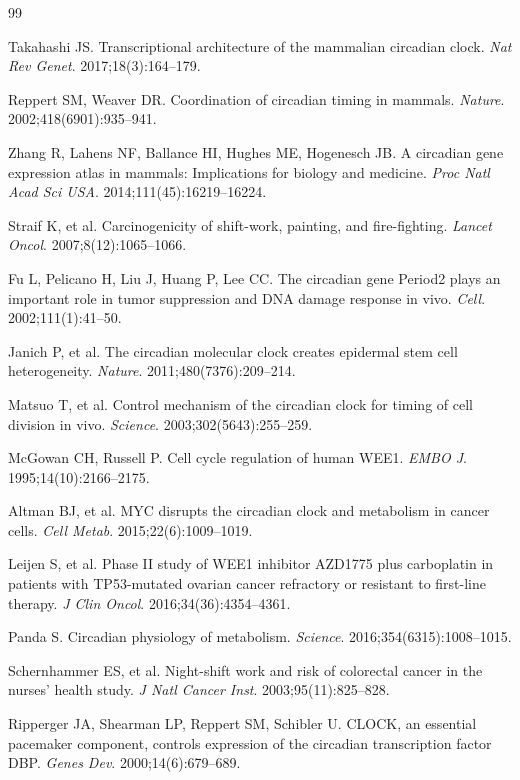 \documentclass[11pt,letterpaper]{article}
\begin{document}

\begin{thebibliography}{99}

Takahashi JS. Transcriptional architecture of the mammalian circadian clock. \textit{Nat Rev Genet}. 2017;18(3):164--179.

Reppert SM, Weaver DR. Coordination of circadian timing in mammals. \textit{Nature}. 2002;418(6901):935--941.

Zhang R, Lahens NF, Ballance HI, Hughes ME, Hogenesch JB. A circadian gene expression atlas in mammals: Implications for biology and medicine. \textit{Proc Natl Acad Sci USA}. 2014;111(45):16219--16224.

Straif K, et al. Carcinogenicity of shift-work, painting, and fire-fighting. \textit{Lancet Oncol}. 2007;8(12):1065--1066.

Fu L, Pelicano H, Liu J, Huang P, Lee CC. The circadian gene Period2 plays an important role in tumor suppression and DNA damage response in vivo. \textit{Cell}. 2002;111(1):41--50.

Janich P, et al. The circadian molecular clock creates epidermal stem cell heterogeneity. \textit{Nature}. 2011;480(7376):209--214.

Matsuo T, et al. Control mechanism of the circadian clock for timing of cell division in vivo. \textit{Science}. 2003;302(5643):255--259.

McGowan CH, Russell P. Cell cycle regulation of human WEE1. \textit{EMBO J}. 1995;14(10):2166--2175.

Altman BJ, et al. MYC disrupts the circadian clock and metabolism in cancer cells. \textit{Cell Metab}. 2015;22(6):1009--1019.

Leijen S, et al. Phase II study of WEE1 inhibitor AZD1775 plus carboplatin in patients with TP53-mutated ovarian cancer refractory or resistant to first-line therapy. \textit{J Clin Oncol}. 2016;34(36):4354--4361.

Panda S. Circadian physiology of metabolism. \textit{Science}. 2016;354(6315):1008--1015.

Schernhammer ES, et al. Night-shift work and risk of colorectal cancer in the nurses' health study. \textit{J Natl Cancer Inst}. 2003;95(11):825--828.

Ripperger JA, Shearman LP, Reppert SM, Schibler U. CLOCK, an essential pacemaker component, controls expression of the circadian transcription factor DBP. \textit{Genes Dev}. 2000;14(6):679--689.


\end{thebibliography}
\end{document}
